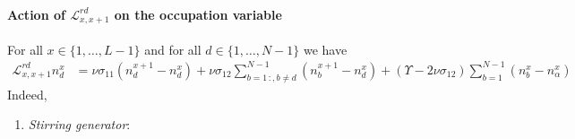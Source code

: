 \documentclass[10pt]{article}
\numberwithin{equation}{section}
\numberwithin{equation}{subsection}
\begin{document}
\paragraph{Action of $\mathcal{L}_{x,x+1}^{rd}$ on the occupation variable}
For all $x\in \{1,\ldots,L-1\}$ and for all $d\in \{1,\ldots,N-1\}$ we have
\begin{equation}\label{actionGraphRD}
	\begin{split}
		\mathcal{L}_{x,x+1}^{rd}n_{d}^{x}&=\nu \sigma_{11}(n_{d}^{x+1}-n_{d}^{x})+\nu\sigma_{12}\sum_{b=1\,:	,b\neq d}^{N-1}(n_{b}^{x+1}-n_{d}^{x})+(\Upsilon-2\nu\sigma_{12})\sum_{b=1}^{N-1}(n_{b}^{x}-n_{\alpha}^{x})
	\end{split}
\end{equation}
Indeed, 
\begin{enumerate}
	\item \textit{Stirring generator}:


\end{enumerate}
\end{document}
